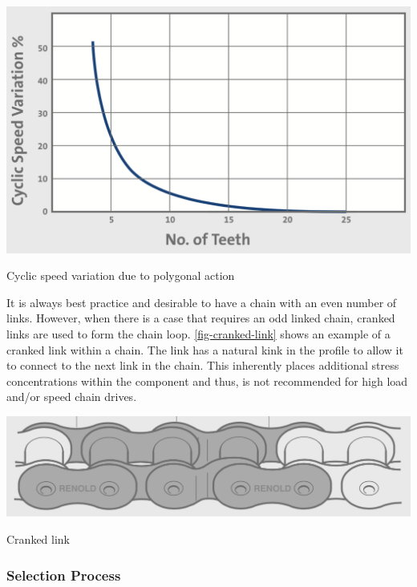 \begin{marginfigure}
  \centering
  \includegraphics[width=\textwidth]{figs/polygonal-action.png}
  \caption[Cyclic speed variation due to polygonal action]{Cyclic speed variation due to polygonal action~\citep[p.24]{renoldchain}}
  \label{fig-cyclic-speed-variation}
\end{marginfigure}

It is always best practice and desirable to have a chain with an even number of links. However, when there is a case that requires an odd linked chain, cranked links are used to form the chain loop. \cref{fig-cranked-link} shows an example of a cranked link within a chain. The link has a natural kink in the profile to allow it to connect to the next link in the chain. This inherently places additional stress concentrations within the component and thus, is not recommended for high load and/or speed chain drives.


\begin{marginfigure}
  \centering
  \includegraphics[width=\textwidth]{figs/cranked-link.png}
  \caption[Cranked link]{Cranked link~\citep[p.11]{renoldchain}}
  \label{fig-cranked-link}
\end{marginfigure}

\subsubsection{Selection Process}

